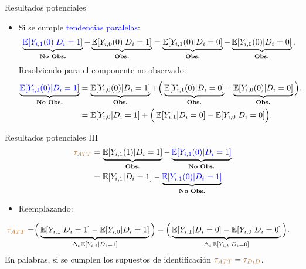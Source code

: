 \documentclass[10pt, xcolor=dvipsnames]{beamer}
\begin{document}
\begin{frame}{Resultados potenciales}
    \begin{itemize}
        \item Si se cumple \textcolor{blue}{tendencias paralelas}:
    {\small
    \begin{align*}
        \underbrace{\textcolor{blue}{\operatorname{\mathbb{E}}[Y_{i,1}(0)|D_i = 1]}}_{\text{\textbf{No Obs.}}} - \underbrace{\operatorname{\mathbb{E}}[Y_{i,0}(0)|D_i = 1]}_{\text{\textbf{Obs.}}} =  \underbrace{\operatorname{\mathbb{E}}[Y_{i,1}(0)|D_i = 0]}_{\text{\textbf{Obs.}}}  - \underbrace{\operatorname{\mathbb{E}}[Y_{i,0}(0)|D_i = 0]}_{\text{\textbf{Obs.}}}.
    \end{align*}
    }
    \pause
    Resolviendo para el componente no observado:
    {\small
    \begin{align*}
    \begin{split}
        \underbrace{\textcolor{blue}{\operatorname{\mathbb{E}}[Y_{i,1}(0)|D_i = 1]}}_{\text{\textbf{No Obs.}}} &= \underbrace{\operatorname{\mathbb{E}}[Y_{i,0}(0)|D_i = 1]}_{\text{\textbf{Obs.}}} +  \Big(\underbrace{\operatorname{\mathbb{E}}[Y_{i,1}(0)|D_i = 0]}_{\text{\textbf{Obs.}}}  - \underbrace{\operatorname{\mathbb{E}}[Y_{i,0}(0)|D_i = 0]}_{\text{\textbf{Obs.}}} \Big). \\
        &= \operatorname{\mathbb{E}}[Y_{i,0} | D_i = 1] +  \Big(\operatorname{\mathbb{E}}[Y_{i,1} | D_i = 0] - \operatorname{\mathbb{E}}[Y_{i,0} | D_i = 0] \Big).
        \end{split}
    \end{align*}
    }
    \end{itemize}	
\end{frame}

\begin{frame}{Resultados potenciales III}
	\begin{align*}
    \begin{split}
        \textcolor{brown}{\tau_{ATT}} &= \underbrace{\operatorname{\mathbb{E}}[Y_{i,1}(1)|D_i = 1]}_{\text{\textbf{Obs.}}} - \underbrace{\textcolor{blue}{\operatorname{\mathbb{E}}[Y_{i,1}(0)|D_i = 1]}}_{\text{\textbf{No Obs.}}} \\ 
        &= \operatorname{\mathbb{E}}[Y_{i,1} | D_i = 1] - \underbrace{\textcolor{blue}{\operatorname{\mathbb{E}}[Y_{i,1}(0)|D_i = 1]}}_{\text{\textbf{No Obs.}}}        
    \end{split}
    \end{align*}
\begin{itemize}
	\item Reemplazando:
\end{itemize}	
    {\small
	\begin{align*}
	\begin{split}
	\textcolor{brown}{\tau_{ATT}} =& \Big(\underbrace{\operatorname{\mathbb{E}}[Y_{i,1} | D_i = 1] - \operatorname{\mathbb{E}}[Y_{i,0} | D_i = 1]}_{\Delta_t \operatorname{\mathbb{E}}[Y_{i,t}|D_i=1]}\Big) - \Big(\underbrace{\operatorname{\mathbb{E}}[Y_{i,1} | D_i = 0] - \operatorname{\mathbb{E}}[Y_{i,0} |D_i = 0]}_{\Delta_t \operatorname{\mathbb{E}}[Y_{i,t}|D_i=0]}\Big).
	\end{split}
	\end{align*}
    }
    En palabras, si se cumplen los supuestos de identificación \(\textcolor{brown}{\tau_{ATT}} = \textcolor{brown}{\tau_{DiD}}\).
\end{frame}
\end{document}
